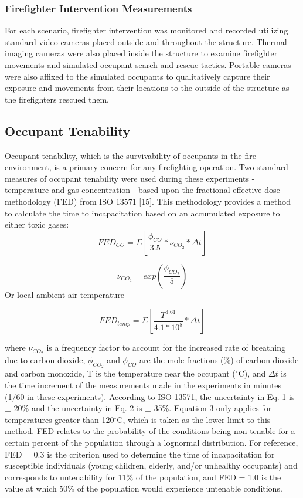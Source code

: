 \documentclass[12pt,oneside]{book}
\begin{document}
\subsubsection{Firefighter Intervention Measurements}
For each scenario, firefighter intervention was monitored and recorded utilizing standard video cameras placed outside and throughout the structure.  Thermal imaging cameras were also placed inside the structure to examine firefighter movements and simulated occupant search and rescue tactics.  Portable cameras were also affixed to the simulated occupants to qualitatively capture their exposure and movements from their locations to the outside of the structure as the firefighters rescued them.
\subsection{Occupant Tenability}
Occupant tenability, which is the survivability of occupants in the fire environment, is a primary concern for any firefighting operation.  Two standard measures of occupant tenability were used during these experiments - temperature and gas concentration - based upon the fractional effective dose methodology (FED) from ISO 13571 [15]. This methodology provides a method to calculate the time to incapacitation based on an accumulated exposure to either toxic gases:
\begin{equation}\label{eqn:FED_co}FED_{CO} = \Sigma [\frac{\phi_{CO}}{3.5}*\nu_{CO_2}*\Delta t]\end{equation}

\begin{equation}\label{eqn:FED_vco2}\nu_{CO_2}=exp(\frac{\phi_{CO_2}}{5})\end{equation}
Or local ambient air temperature 

\begin{equation}\label{eqn:FED_temp}FED_{temp}=\Sigma[\frac{T^{3.61}}{4.1*10^8}*\Delta t]\end{equation}

where $\nu_{CO_2}$ is a frequency factor to account for the increased rate of breathing due to carbon dioxide, $\phi_{CO_2}$ and $\phi_{CO}$ are the mole fractions (\%) of carbon dioxide and carbon monoxide, T is the temperature near the occupant ($^{\circ}$C), and $\Delta t$ is the time increment of the measurements made in the experiments in minutes (1/60 in these experiments).  According to ISO 13571, the uncertainty in Eq. 1 is $\pm$ 20\% and the uncertainty in Eq. 2 is $\pm$ 35\%.  Equation 3 only applies for temperatures greater than 120$^{\circ}$C, which is taken as the lower limit to this method.  
FED relates to the probability of the conditions being non-tenable for a certain percent of the population through a lognormal distribution.  For reference, FED = 0.3 is the criterion used to determine the time of incapacitation for susceptible individuals (young children, elderly, and/or unhealthy occupants) and corresponds to untenability for 11\% of the population, and FED = 1.0 is the value at which 50\% of the population would experience untenable conditions.
\end{document}
